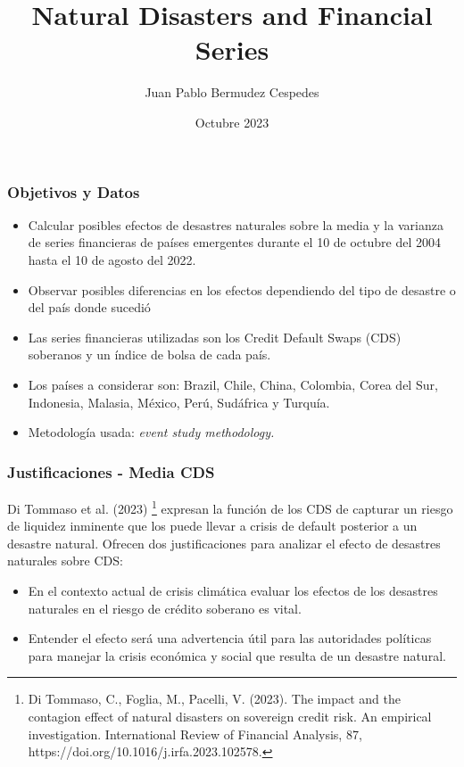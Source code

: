 \documentclass{beamer}
\title{Natural Disasters and Financial Series}
\author[Bermudez, Juan Pablo] 
{Juan Pablo Bermudez Cespedes}
\institute[BR] 
{
  Pasante de economía\\
  Banco de la República de Colombia
}
\date[2023] %
{Octubre 2023}
\begin{document}
\frame{\titlepage}



\begin{frame}
\frametitle{Objetivos y Datos}
\begin{itemize}
    \item Calcular posibles efectos de desastres naturales sobre la media y la varianza de series financieras de países emergentes durante el 10 de octubre del 2004 hasta el 10 de agosto del 2022.
    \item Observar posibles diferencias en los efectos dependiendo del tipo de desastre o del país donde sucedió
    \item Las series financieras utilizadas son los Credit Default Swaps (CDS) soberanos y un índice de bolsa de cada país. 
    \item Los países a considerar son: Brazil, Chile, China, Colombia, Corea del Sur, Indonesia, Malasia, México, Perú, Sudáfrica y Turquía.
    \item Metodología usada: \textit{event study methodology.}
\end{itemize}
\end{frame}

\begin{frame}
\frametitle{Justificaciones - Media CDS}
Di Tommaso et al. (2023) \footnote{Di Tommaso, C., Foglia, M., Pacelli, V. (2023). The impact and the contagion effect of natural disasters on sovereign credit risk. An empirical investigation. International Review of Financial Analysis, 87, https://doi.org/10.1016/j.irfa.2023.102578.} expresan la función de los CDS de capturar un riesgo de liquidez inminente que los puede llevar a crisis de default posterior a un desastre natural. Ofrecen dos justificaciones para analizar el efecto de desastres naturales sobre CDS:
\begin{itemize}
     \item En el contexto actual de crisis climática evaluar los efectos de los desastres naturales en el riesgo de crédito soberano es vital.
     \item Entender el efecto será una advertencia útil para las autoridades políticas para manejar la crisis económica y social que resulta de un desastre natural.
\end{itemize}
\end{frame}
\end{document}
